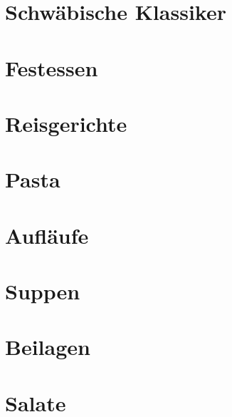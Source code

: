 \documentclass[11pt, DIV=15, twoside=false]{scrbook}
\begin{document}
\newcommand\x{1} %

\tableofcontents

\part{Schwäbische Klassiker}


\part{Festessen}






\part{Reisgerichte}




\part{Pasta}





\part{Aufläufe}





\part{Suppen}



\part{Beilagen}


\part{Salate}

\end{document}
